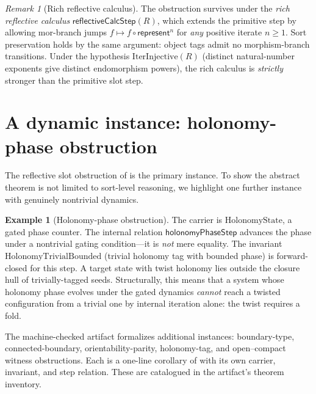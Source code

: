 \documentclass[11pt]{article}
\theoremstyle{plain}
\theoremstyle{definition}
\newtheorem{example}[theorem]{Example}
\theoremstyle{remark}
\newtheorem{remark}[theorem]{Remark}
\newcommand{\represent}{\mathsf{represent}}
\begin{document}
\begin{remark}[Rich reflective calculus]\label{rem:rich-calculus}
The obstruction survives under the \emph{rich reflective calculus}
$\mathsf{reflectiveCalcStep}(R)$, which extends the primitive step by allowing
mor-branch jumps $f \mapsto f \circ \represent^n$ for \emph{any} positive iterate
$n \geq 1$.  Sort preservation holds by the same argument: object tags admit no
morphism-branch transitions.  Under the hypothesis $\mathrm{IterInjective}(R)$
(distinct natural-number exponents give distinct endomorphism powers), the rich
calculus is \emph{strictly} stronger than the primitive slot step.
\end{remark}

\section{A dynamic instance: holonomy-phase obstruction}\label{sec:instances}

The reflective slot obstruction of  is the primary instance.  To
show the abstract theorem is not limited to sort-level reasoning, we highlight one
further instance with genuinely nontrivial dynamics.

\begin{example}[Holonomy-phase obstruction]\label{ex:holonomy}
The carrier is $\mathrm{HolonomyState}$, a gated phase counter.  The internal relation
$\mathsf{holonomyPhaseStep}$ advances the phase under a nontrivial gating condition---it
is \emph{not} mere equality.  The invariant $\mathrm{HolonomyTrivialBounded}$
(trivial holonomy tag with bounded phase) is forward-closed for this step.  A target
state with twist holonomy lies outside the closure hull of trivially-tagged seeds.
Structurally, this means that a system whose holonomy phase evolves under the gated
dynamics \emph{cannot} reach a twisted configuration from a trivial one by internal
iteration alone: the twist requires a fold.
\end{example}

\noindent The machine-checked artifact formalizes additional instances: boundary-type,
connected-boundary, orientability-parity, holonomy-tag, and open--compact witness
obstructions.  Each is a one-line corollary of  with its own
carrier, invariant, and step relation.  These are catalogued in the artifact's theorem
inventory.
\end{document}
